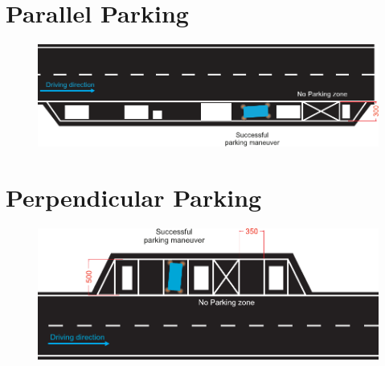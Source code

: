 \begin{figure}[H]
\begin{center}
	\end{center}
\end{figure}

\section{Parallel Parking}
\label{fig_parallel_parking}
\begin{figure}[H]
	\begin{center}
		\centering\includegraphics[]{graphics/Abb_2_parallel_parking.pdf}
	\end{center}
\end{figure}

\section{Perpendicular Parking}
\begin{figure}[H]
	\label{fig_perpendicular_parking}
	\begin{center}
		\centering\includegraphics[]{graphics/Abb_3_perpendicular_parking.pdf}
	\end{center}
\end{figure}

